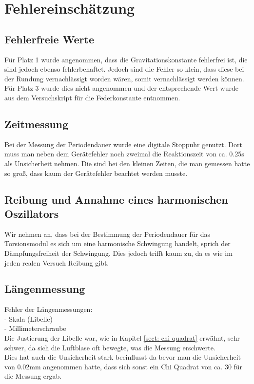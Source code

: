 \documentclass[bibliography=totocnumbered]{scrartcl}
\begin{document}
	\section{Fehlereinschätzung}
	\subsection{Fehlerfreie Werte}
	Für Platz 1 wurde angenommen, dass die Gravitationskonstante fehlerfrei ist, die sind jedoch ebenso fehlerbehaftet. Jedoch sind die Fehler so klein, dass diese bei der Rundung vernachlässigt worden wären, somit vernachlässigt werden können.\\
	Für Platz 3 wurde dies nicht angenommen und der entsprechende Wert wurde aus dem Versuchskript\smartcite{Muller.b} für die Federkonstante entnommen.
	
	\subsection{Zeitmessung}
	Bei der Messung der Periodendauer wurde eine digitale Stoppuhr genutzt. Dort muss man neben dem Gerätefehler noch zweimal die Reaktionszeit von ca. 0.25s als Unsicherheit nehmen. Die sind bei den kleinen Zeiten, die man gemessen hatte so groß, dass kaum der Gerätefehler beachtet werden musste.
	
	\subsection{Reibung und Annahme eines harmonischen Oszillators}
	Wir nehmen an, dass bei der Bestimmung der Periodendauer für das Torsionsmodul es sich um eine harmonische Schwingung handelt, sprich der Dämpfungsfreiheit der Schwingung. Dies jedoch trifft kaum zu, da es wie im jeden realen Versuch Reibung gibt.
	
	\subsection{Längenmessung}
	Fehler der Längenmessungen:\\
	- Skala (Libelle)\smartcite{Wikipedia.2019}\\
	- Millimeterschraube\\
	Die Justierung der Libelle war, wie in Kapitel \ref{sect: chi quadrat} erwähnt, sehr schwer, da sich die Luftblase oft bewegte, was die Messung erschwerte.\\
	Dies hat auch die Unsicherheit stark beeinflusst da bevor man die Unsicherheit von 0.02mm angenommen hatte, dass sich sonst ein Chi Quadrat von ca. 30 für die Messung ergab.
	\newpage
\end{document}

